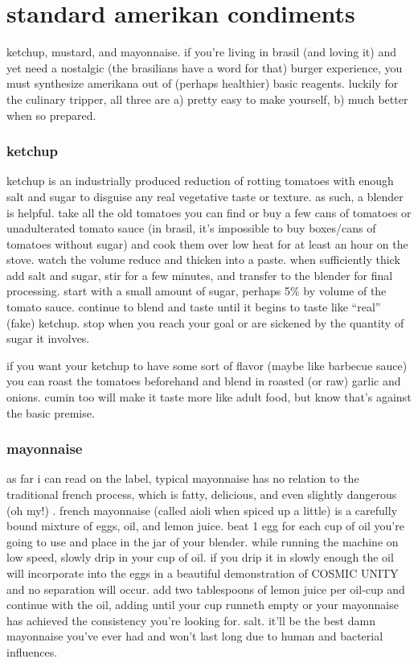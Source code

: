 \section{standard amerikan condiments}

ketchup, mustard, and mayonnaise. if you're living in brasil (and loving it) 
and yet need a nostalgic (the brasilians have a word for that) burger 
experience, you must synthesize amerikana out of (perhaps healthier) basic 
reagents. luckily for the culinary tripper, all three are a) pretty easy to 
make yourself, b) much better when so prepared.

\subsubsection{ketchup}

ketchup is an industrially produced reduction of rotting tomatoes with enough 
salt and sugar to disguise any real vegetative taste or texture. as such, a 
blender is helpful. take all the old tomatoes you can find or buy a few cans 
of tomatoes or unadulterated tomato sauce (in brasil, it's impossible to buy 
boxes/cans of tomatoes without sugar) and cook them over low heat for at least 
an hour on the stove. watch the volume reduce and thicken into a paste. when 
sufficiently thick add salt and sugar, stir for a few minutes, and transfer to 
the blender for final processing. start with a small amount of sugar, perhaps 
5\% by volume of the tomato sauce. continue to blend and taste until it begins 
to taste like ``real'' (fake) ketchup. stop when you reach your goal or are 
sickened by the quantity of sugar it involves.

if you want your ketchup to have some sort of flavor (maybe like barbecue 
sauce) you can roast the tomatoes beforehand and blend in roasted (or raw) 
garlic and onions. cumin too will make it taste more like adult food, but know 
that's against the basic premise.

\subsubsection{mayonnaise}

as far i can read on the label, typical mayonnaise has no relation to the 
traditional french process, which is fatty, delicious, and even slightly 
dangerous (oh my!) . french mayonnaise (called aioli when spiced up a little) 
is a carefully bound mixture of eggs, oil, and lemon juice. beat 1 egg for 
each cup of oil you're going to use and place in the jar of your blender. 
while running the machine on low speed, slowly drip in your cup of oil. if you 
drip it in slowly enough the oil will incorporate into the eggs in a beautiful 
demonstration of COSMIC UNITY and no separation will occur. add two 
tablespoons of lemon juice per oil-cup and continue with the oil, adding until 
your cup runneth empty or your mayonnaise has achieved the consistency you're 
looking for. salt. it'll be the best damn mayonnaise you've ever had and won't 
last long due to human and bacterial influences.

